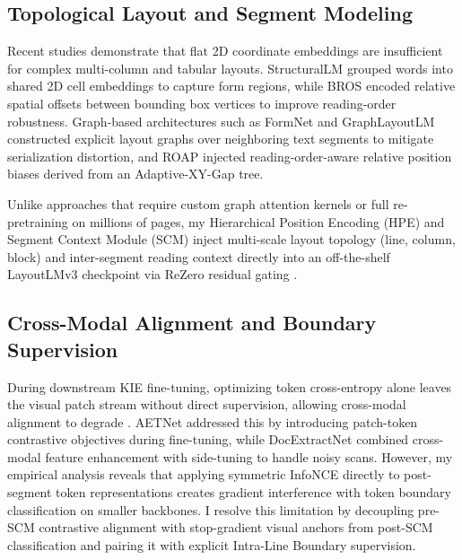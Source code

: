 \subsection{Topological Layout and Segment Modeling}

Recent studies demonstrate that flat 2D coordinate embeddings are insufficient for complex multi-column and tabular layouts. StructuralLM \cite{li2021structurallm} grouped words into shared 2D cell embeddings to capture form regions, while BROS \cite{hong2022bros} encoded relative spatial offsets between bounding box vertices to improve reading-order robustness. Graph-based architectures such as FormNet \cite{lee2022formnet} and GraphLayoutLM \cite{li2023graphlayoutlm} constructed explicit layout graphs over neighboring text segments to mitigate serialization distortion, and ROAP \cite{xie2026roap} injected reading-order-aware relative position biases derived from an Adaptive-XY-Gap tree.

Unlike approaches that require custom graph attention kernels or full re-pretraining on millions of pages, my Hierarchical Position Encoding (HPE) and Segment Context Module (SCM) inject multi-scale layout topology (line, column, block) and inter-segment reading context directly into an off-the-shelf LayoutLMv3 checkpoint via ReZero residual gating \cite{bachlechner2021rezero}.

\subsection{Cross-Modal Alignment and Boundary Supervision}

During downstream KIE fine-tuning, optimizing token cross-entropy alone leaves the visual patch stream without direct supervision, allowing cross-modal alignment to degrade \cite{wang2023aetnet}. AETNet \cite{wang2023aetnet} addressed this by introducing patch-token contrastive objectives during fine-tuning, while DocExtractNet \cite{yan2025docextractnet} combined cross-modal feature enhancement with side-tuning to handle noisy scans. However, my empirical analysis reveals that applying symmetric InfoNCE directly to post-segment token representations creates gradient interference with token boundary classification on smaller backbones. I resolve this limitation by decoupling pre-SCM contrastive alignment with stop-gradient visual anchors from post-SCM classification and pairing it with explicit Intra-Line Boundary supervision.
